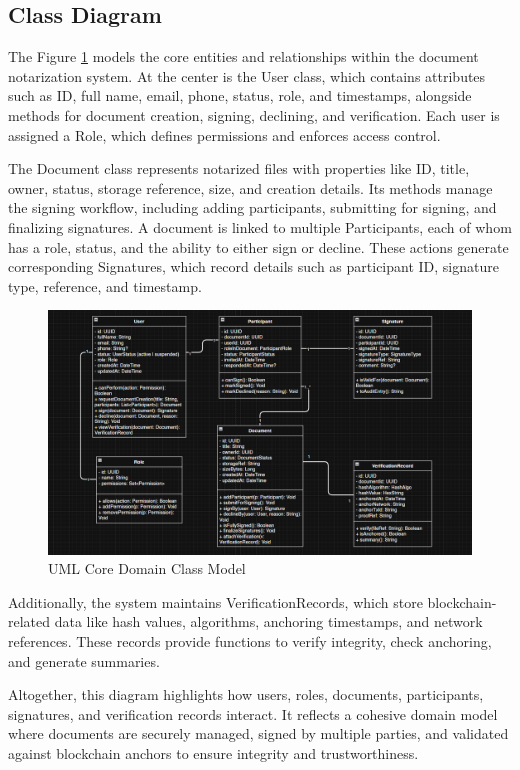 \subsection{Class Diagram}
The Figure \ref{uml-class-core-domain} models the core entities and relationships within the document notarization system. At the center is the User class, which contains attributes such as ID, full name, email, phone, status, role, and timestamps, alongside methods for document creation, signing, declining, and verification. Each user is assigned a Role, which defines permissions and enforces access control.

The Document class represents notarized files with properties like ID, title, owner, status, storage reference, size, and creation details. Its methods manage the signing workflow, including adding participants, submitting for signing, and finalizing signatures. A document is linked to multiple Participants, each of whom has a role, status, and the ability to either sign or decline. These actions generate corresponding Signatures, which record details such as participant ID, signature type, reference, and timestamp.

\begin{figure}[H]
    \centering
    \includegraphics[width=18cm]{"images/umlDiagrams/uml-class-core-domain.png"}
    \caption{UML Core Domain Class Model}
    \label{uml-class-core-domain}
\end{figure}

Additionally, the system maintains VerificationRecords, which store blockchain-related data like hash values, algorithms, anchoring timestamps, and network references. These records provide functions to verify integrity, check anchoring, and generate summaries.

Altogether, this diagram highlights how users, roles, documents, participants, signatures, and verification records interact. It reflects a cohesive domain model where documents are securely managed, signed by multiple parties, and validated against blockchain anchors to ensure integrity and trustworthiness.

